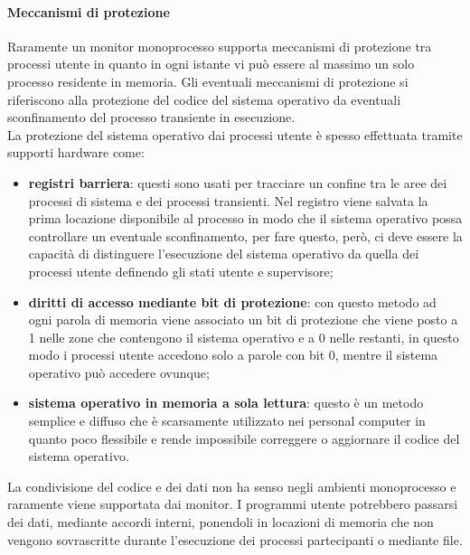 \documentclass[12pt, letterpaper]{report}
\begin{document}
	\paragraph{Meccanismi di protezione} Raramente un monitor monoprocesso supporta meccanismi di protezione tra processi utente in quanto in ogni istante vi può essere al massimo un solo processo residente in memoria. Gli eventuali meccanismi di protezione si riferiscono alla protezione del codice del sistema operativo da eventuali sconfinamento del processo transiente in esecuzione. \\
	La protezione del sistema operativo dai processi utente è spesso effettuata tramite supporti hardware come:
	\begin{itemize}
		\item \textbf{registri barriera}: questi sono usati per tracciare un confine tra le aree dei processi di sistema e dei processi transienti. Nel registro viene salvata la prima locazione disponibile al processo in modo che il sistema operativo possa controllare un eventuale sconfinamento, per fare questo, però, ci deve essere la capacità di distinguere l'esecuzione del sistema operativo da quella dei processi utente definendo gli stati utente e supervisore;
		\item \textbf{diritti di accesso mediante bit di protezione}: con questo metodo ad ogni parola di memoria viene associato un bit di protezione che viene posto a 1 nelle zone che contengono il sistema operativo e a 0 nelle restanti, in questo modo i processi utente accedono solo a parole con bit 0, mentre il sistema operativo può accedere ovunque;
		\item \textbf{sistema operativo in memoria a sola lettura}: questo è un metodo semplice e diffuso che è scarsamente utilizzato nei personal computer in quanto poco flessibile e rende impossibile correggere o aggiornare il codice del sistema operativo.
	\end{itemize}
	La condivisione del codice e dei dati non ha senso negli ambienti monoprocesso e raramente viene supportata dai monitor. I programmi utente potrebbero passarsi dei dati, mediante accordi interni, ponendoli in locazioni di memoria che non vengono sovrascritte durante l'esecuzione dei processi partecipanti o mediante file.
\end{document}
